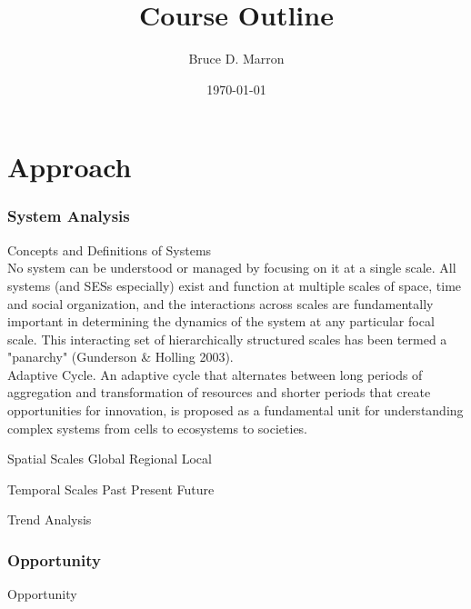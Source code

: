 \documentclass[12pt, letterpaper]{article}
\title{\vspace{-15mm}\fontsize{14pt}{10pt}
                    \selectfont \textbf{Course Outline}   %
                    \vspace{-7mm}
      }
\author{
     \normalsize Bruce D. Marron \\                     %
     \vspace{-5mm}
}
\date{\normalsize \today}
\begin{document}
\begin{singlespacing}
\maketitle                                      %
\end{singlespacing}
\thispagestyle{fancy}                           %

\section{Approach}
\subsubsection{System Analysis}
\begin{outline}[enumerate]
\1 Concepts and Definitions of Systems \\
No system can be understood or managed by focusing on it at a single scale. All systems (and SESs especially) exist and function at multiple scales of space, time and social organization, and the interactions across scales are fundamentally important in determining the dynamics of the system at any particular focal scale. This interacting set of hierarchically structured scales has been termed a "panarchy" (Gunderson \& Holling 2003). \\

Adaptive Cycle. An adaptive cycle that alternates between long periods of aggregation and transformation of resources and shorter periods that create opportunities for innovation, is proposed as a fundamental unit for understanding complex systems from cells to ecosystems to societies.

\1 Spatial Scales
\2 Global
\2 Regional
\2 Local

\1 Temporal Scales
\2 Past
\2 Present
\2 Future

\1 Trend Analysis

\end{outline}

\subsubsection{Opportunity}
\begin{outline}[enumerate]
\1 Opportunity
\end{outline}
\end{document}
